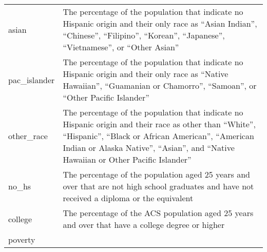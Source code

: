 \documentclass[12pt,twoside]{reedthesis}
\begin{document}
\begin{longtable}[]{@{}ll@{}}
\begin{minipage}[t]{0.44\columnwidth}
asian\strut
\end{minipage} & \begin{minipage}[t]{0.50\columnwidth}\raggedright
The percentage of the population that indicate no Hispanic origin and their only race as ``Asian Indian'', ``Chinese'', ``Filipino'', ``Korean'', ``Japanese'', ``Vietnamese'', or ``Other Asian''\strut
\end{minipage}\tabularnewline
\begin{minipage}[t]{0.44\columnwidth}\raggedright
pac\_islander\strut
\end{minipage} & \begin{minipage}[t]{0.50\columnwidth}\raggedright
The percentage of the population that indicate no Hispanic origin and their only race as ``Native Hawaiian'', ``Guamanian or Chamorro'', ``Samoan'', or ``Other Pacific Islander''\strut
\end{minipage}\tabularnewline
\begin{minipage}[t]{0.44\columnwidth}\raggedright
other\_race\strut
\end{minipage} & \begin{minipage}[t]{0.50\columnwidth}\raggedright
The percentage of the population that indicate no Hispanic origin and their race as other than ``White'', ``Hispanic'', ``Black or African American'', ``American Indian or Alaska Native'', ``Asian'', and ``Native Hawaiian or Other Pacific Islander''\strut
\end{minipage}\tabularnewline
\begin{minipage}[t]{0.44\columnwidth}\raggedright
no\_hs\strut
\end{minipage} & \begin{minipage}[t]{0.50\columnwidth}\raggedright
The percentage of the population aged 25 years and over that are not high school graduates and have not received a diploma or the equivalent\strut
\end{minipage}\tabularnewline
\begin{minipage}[t]{0.44\columnwidth}\raggedright
college\strut
\end{minipage} & \begin{minipage}[t]{0.50\columnwidth}\raggedright
The percentage of the ACS population aged 25 years and over that have a college degree or higher\strut
\end{minipage}\tabularnewline
\begin{minipage}[t]{0.44\columnwidth}\raggedright
poverty\strut
\end{minipage} & \begin{minipage}[t]{0.50\columnwidth}\raggedright

\end{minipage}
\end{longtable}
\end{document}
